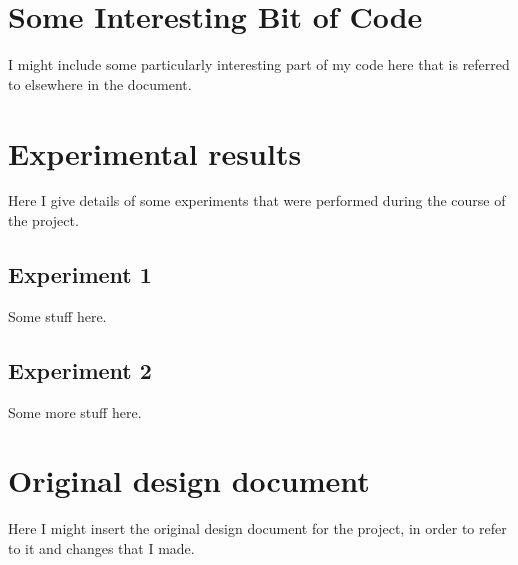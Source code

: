 \documentclass[a4paper,11pt]{report}
\begin{document}
\appendix


\chapter{Some Interesting Bit of Code}\label{app:Code}

I might include some particularly interesting part of my code here that is
referred to elsewhere in the document.  




\chapter{Experimental results}\label{app:Experiments}

Here I give details of some experiments that were performed during the
course of the project.  

\section{Experiment 1}

Some stuff here.  


\section{Experiment 2}

Some more stuff here.


\chapter{Original design document}\label{app:Original_design}

Here I might insert the original design document for the project, in order
to refer to it and changes that I made.  
\end{document}
